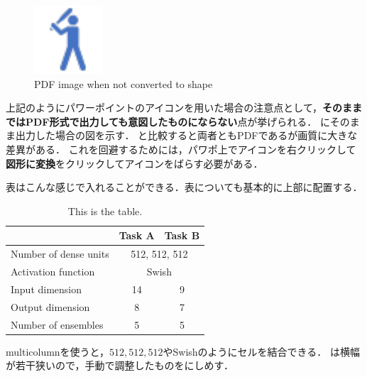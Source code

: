 \begin{figure}[t]
    \centering
    \includegraphics[clip, width=0.3\linewidth]{figures/hit.pdf}
    \caption{PDF image when not converted to shape}
    \label{fig: unconverted_pdf}
\end{figure}


上記のようにパワーポイントのアイコンを用いた場合の注意点として，\textbf{そのままではPDF形式で出力しても意図したものにならない}点が挙げられる．
にそのまま出力した場合の図を示す．
と比較すると両者ともPDFであるが画質に大きな差異がある．
これを回避するためには，パワポ上でアイコンを右クリックして\textbf{図形に変換}をクリックしてアイコンをばらす必要がある．

\newpage

表はこんな感じで入れることができる．表についても基本的に上部に配置する．

\begin{table}[t]
    \centering
    \begin{tabular}{l|cc}
        \toprule
                                & \textbf{Task A} & \textbf{Task B}  \\
        \midrule
        Number of dense units   & \multicolumn{2}{c}{512, 512, 512} \\
        Activation function     & \multicolumn{2}{c}{Swish} \\
        Input dimension         & 14 & 9 \\
        Output dimension        & 8  & 7 \\
        Number of ensembles     & 5  & 5 \\
        \bottomrule
    \end{tabular}
    \caption{This is the table.}
    \label{tab: sample}
\end{table}

multicolumnを使うと，$512, 512, 512$やSwishのようにセルを結合できる．
は横幅が若干狭いので，手動で調整したものをにしめす．

